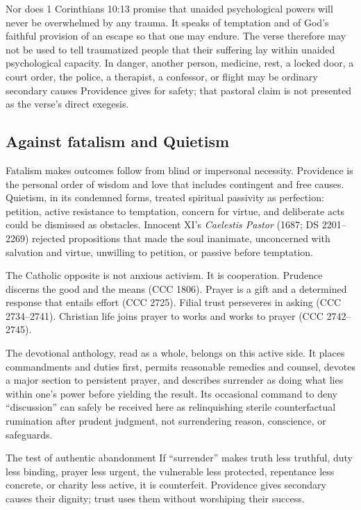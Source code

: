 Nor does 1 Corinthians 10:13 promise that unaided psychological powers will never be overwhelmed by any trauma. It speaks of temptation and of God's faithful provision of an escape so that one may endure. The verse therefore may not be used to tell traumatized people that their suffering lay within unaided psychological capacity. In danger, another person, medicine, rest, a locked door, a court order, the police, a therapist, a confessor, or flight may be ordinary secondary causes Providence gives for safety; that pastoral claim is not presented as the verse's direct exegesis.

\subsection{Against fatalism and Quietism}

Fatalism makes outcomes follow from blind or impersonal necessity. Providence is the personal order of wisdom and love that includes contingent and free causes. Quietism, in its condemned forms, treated spiritual passivity as perfection: petition, active resistance to temptation, concern for virtue, and deliberate acts could be dismissed as obstacles. Innocent XI's \emph{Caelestis Pastor} (1687; DS 2201--2269) rejected propositions that made the soul inanimate, unconcerned with salvation and virtue, unwilling to petition, or passive before temptation.

The Catholic opposite is not anxious activism. It is cooperation. Prudence discerns the good and the means (CCC 1806). Prayer is a gift and a determined response that entails effort (CCC 2725). Filial trust perseveres in asking (CCC 2734--2741). Christian life joins prayer to works and works to prayer (CCC 2742--2745).

The devotional anthology, read as a whole, belongs on this active side. It places commandments and duties first, permits reasonable remedies and counsel, devotes a major section to persistent prayer, and describes surrender as doing what lies within one's power before yielding the result. Its occasional command to deny ``discussion'' can safely be received here as relinquishing sterile counterfactual rumination after prudent judgment, not surrendering reason, conscience, or safeguards.

\begin{studybox}{The test of authentic abandonment}
If ``surrender'' makes truth less truthful, duty less binding, prayer less urgent, the vulnerable less protected, repentance less concrete, or charity less active, it is counterfeit. Providence gives secondary causes their dignity; trust uses them without worshiping their success.
\end{studybox}
